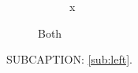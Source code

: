 \documentclass{article}
\begin{document}
\listoffigures
\begin{figure}
  \begin{subfigure}{.4\linewidth}x\end{subfigure}
  \caption{Both}
\end{figure}
SUBCAPTION: \ref{sub:left}.
\end{document}
